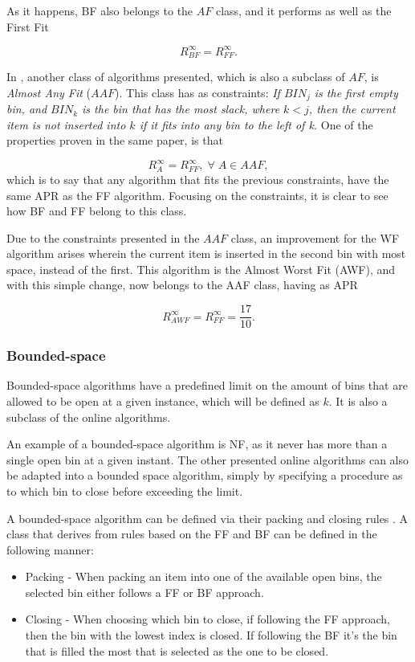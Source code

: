 As it happens, BF also belongs to the $AF$ class, and it performs as well as the First Fit

\begin{equation}
    R_{BF}^\infty = R_{FF}^\infty.
\end{equation}

In \cite{johnson1974fast}, another class of algorithms presented, which is also a subclass of $AF$, is \textit{Almost Any Fit} ($AAF$). This class has as constraints: 
\textit{If $BIN_j$ is the first empty bin, and $BIN_k$ is the bin that has the most slack, where $k < j$, then the current item is not inserted into $k$ if it fits into any bin to the left of k.} One of the properties proven in the same paper, is that 

\begin{equation}
    R_A^\infty = R_{FF}^\infty, \; \forall \; A \in AAF,
\end{equation}
which is to say that any algorithm that fits the previous constraints, have the same APR as the FF algorithm. Focusing on the constraints, it is clear to see how BF and FF belong to this class. 

Due to the constraints presented in the $AAF$ class, an improvement for the WF algorithm arises wherein the current item is inserted in the second bin with most space, instead of the first. This algorithm is the Almost Worst Fit (AWF), and with this simple change, now belongs to the AAF class, having as APR

\begin{equation}
    R_{AWF}^\infty = R_{FF}^\infty = \frac{17}{10}.
\end{equation}

\subsubsection{Bounded-space} 

Bounded-space algorithms have a predefined limit on the amount of bins that are allowed to be open at a given instance, which will be defined as $k$. It is also a subclass of the online algorithms.

An example of a bounded-space algorithm is NF, as it never has more than a single open bin at a given instant. The other presented online algorithms can also be adapted into a bounded space algorithm, simply by specifying a procedure as to which bin to close before exceeding the limit.

A bounded-space algorithm can be defined via their packing and closing rules \cite{coffman2013bin}. A class that derives from rules based on the FF and BF can be defined in the following manner: 
\begin{itemize}
    \item Packing - When packing an item into one of the available open bins, the selected bin either follows a FF or BF approach.
    \item Closing - When choosing which bin to close, if following the FF approach, then the bin with the lowest index is closed. If following the BF it's the bin that is filled the most that is selected as the one to be closed.
\end{itemize}

